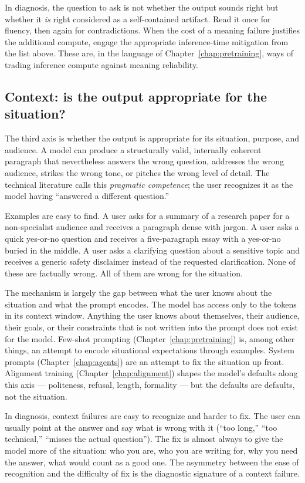 In diagnosis, the question to ask is not whether the output sounds
right but whether it \emph{is} right considered as a self-contained
artifact. Read it once for fluency, then again for contradictions.
When the cost of a meaning failure justifies the additional
compute, engage the appropriate inference-time mitigation from the
list above. These are, in the language of Chapter~\ref{chap:pretraining}, ways of
trading inference compute against meaning reliability.

\subsection{Context: is the output appropriate for the situation?}

The third axis is whether the output is appropriate for its
situation, purpose, and audience. A model can produce a
structurally valid, internally coherent paragraph that nevertheless
answers the wrong question, addresses the wrong audience, strikes
the wrong tone, or pitches the wrong level of detail. The
technical literature calls this \emph{pragmatic competence}; the
user recognizes it as the model having ``answered a different
question.''

Examples are easy to find. A user asks for a summary of a research
paper for a non-specialist audience and receives a paragraph dense
with jargon. A user asks a quick yes-or-no question and receives a
five-paragraph essay with a yes-or-no buried in the middle. A user
asks a clarifying question about a sensitive topic and receives a
generic safety disclaimer instead of the requested clarification.
None of these are factually wrong. All of them are wrong for the
situation.

The mechanism is largely the gap between what the user knows about
the situation and what the prompt encodes. The model has access
only to the tokens in its context window. Anything the user knows
about themselves, their audience, their goals, or their constraints
that is not written into the prompt does not exist for the model.
Few-shot prompting (Chapter~\ref{chap:pretraining}) is, among other things, an attempt
to encode situational expectations through examples. System prompts
(Chapter~\ref{chap:agents}) are an attempt to fix the situation up front.
Alignment training (Chapter~\ref{chap:alignment}) shapes the model's defaults along
this axis --- politeness, refusal, length, formality --- but the
defaults are defaults, not the situation.

In diagnosis, context failures are easy to recognize and harder to
fix. The user can usually point at the answer and say what is
wrong with it (``too long,'' ``too technical,'' ``misses the
actual question''). The fix is almost always to give the model
more of the situation: who you are, who you are writing for, why
you need the answer, what would count as a good one. The asymmetry
between the ease of recognition and the difficulty of fix is the
diagnostic signature of a context failure.

